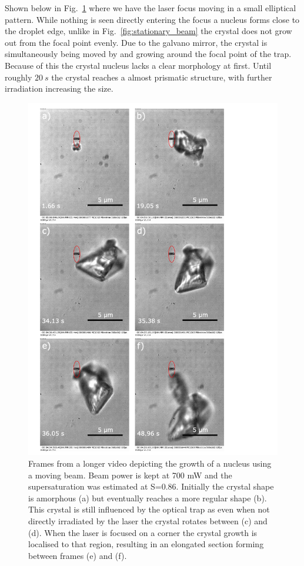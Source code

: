 Shown below in Fig.~\ref{fig:eliptical_beam_1} where 
we have the laser focus moving in a small elliptical 
pattern. While nothing is seen directly entering the 
focus a nucleus forms close to the droplet edge, 
unlike in Fig.~\ref{fig:stationary_beam} the crystal 
does not grow out from the focal point evenly. Due to 
the galvano mirror, the crystal is simultaneously 
being moved by and growing around the focal point of 
the trap. Because of this the crystal nucleus lacks 
a clear morphology at first. Until roughly $20\ s$ 
the crystal reaches a almost prismatic structure, 
with further irradiation increasing the size.
\begin{figure}[h!]
	\centering
	\includegraphics[width=0.8\linewidth]{frames_eliptical_beam.pdf}
	\caption{Frames from a longer video depicting the growth 
		of a nucleus using a moving beam. Beam power is kept 
		at 700 mW and the supersaturation was estimated at 
		S=0.86. Initially the crystal shape is amorphous (a) 
		but eventually reaches a more regular shape (b). This crystal is still influenced by the optical trap as 
		even when not directly irradiated by the laser the 
		crystal rotates between (c) and (d). When the laser 
		is focused on a corner the crystal growth is localised 
		to that region, resulting in an elongated section 
		forming between frames (e) and (f).}
	\label{fig:eliptical_beam_1}
\end{figure} 

